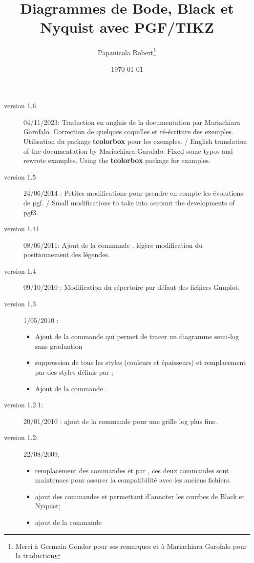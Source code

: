 \documentclass[a4paper,12pt]{article}                      %
\title{Diagrammes de Bode, Black et Nyquist   avec  PGF/TIKZ}                                    %
\author{Papanicola Robert\thanks{Merci à Germain Gondor pour ses remarques et à Mariachiara Garofalo pour la traduction}}                                   %
\date{\today}                                     %
\newcommand{\TradEnLigne}[2]{
#1 / {\color{blue}#2}
}
\begin{document}
\maketitle


\begin{description}
\item[version 1.6]  04/11/2023: \TradEnLigne{Traduction en anglais  de la documentation par Mariachiara Garofalo. Correction de quelques coquilles et ré-écriture des exemples. Utilisation du package \textbf{tcolorbox} pour les exemples.}{English translation of the documentation by Mariachiara Garofalo. Fixed some typos and rewrote examples. Using the \textbf{tcolorbox} package for examples.}
\item[version 1.5] 24/06/2014 : \TradEnLigne{Petites modifications pour prendre en compte les évolutions de pgf.}{Small modifications to take into account the developments of pgf3.}
\item[version 1.41] 08/06/2011: Ajout de la commande  \myverb{\Unites{}}, légère modification du positionnement des légendes.
\item[version 1.4] 09/10/2010 : Modification du répertoire par défaut des fichiers Gnuplot.
\item[version 1.3] 1/05/2010 : 
\begin{itemize}
\item Ajout de la commande  \myverb{\semilogNG} qui permet de tracer un diagramme semi-log sans graduation
\item suppression de tous les styles (couleurs et épaisseurs) et remplacement par des styles définis par  \myverb{\tikzset};
\item Ajout de la commande  \myverb{\BodePoint}.

\end{itemize}
\item[version 1.2.1:] 20/01/2010 : ajout de la commande  \myverb{\semilog*} pour une grille log plus fine.
\item [version 1.2:] 22/08/2009, 
\begin{itemize}
\item remplacement des commandes  \myverb{\BodeAmp}  et  \myverb{\BodeArg} par  \myverb{\BodeGraph},   ces deux commandes sont maintenues pour assurer la compatibilité avec les anciens fichiers.
\item ajout des commandes  \myverb{\BlackText}  et  \myverb{\NyquistText}  permettant d'annoter les courbes de Black et Nyquist;
\item ajout de la commande  \myverb{\BodePoint}


\end{itemize}
\end{description}
\end{document}
